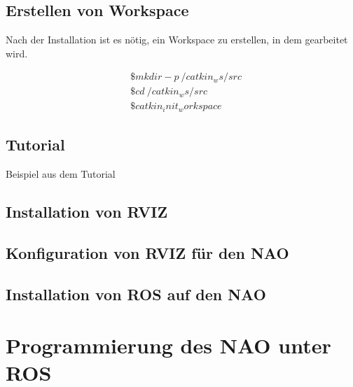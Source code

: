 \documentclass{scrartcl}
\begin{document}
\subsection{Erstellen von Workspace}

Nach der Installation ist es nötig, ein Workspace zu erstellen, in dem gearbeitet wird.

\begin{align}
&\$ mkdir -p ~/catkin_ws/src\\
&\$ cd ~/catkin_ws/src\\
&\$ catkin_init_workspace
\end{align}
\subsection{Tutorial}
Beispiel aus dem Tutorial
\subsection{Installation von RVIZ}
\subsection{Konfiguration von RVIZ für den NAO}
\subsection{Installation von ROS auf den NAO}


\section{Programmierung des NAO unter ROS}
\end{document}
